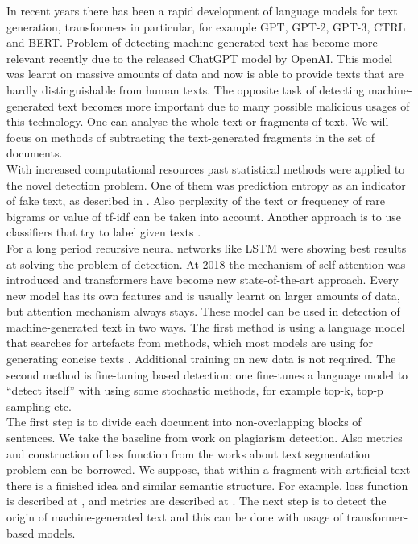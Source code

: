 \documentclass{article}
\begin{document}
In recent years there has been a rapid development of language models for text generation, transformers in particular, for example GPT\cite{gpt}, GPT-2\cite{gpt2}, GPT-3\cite{gpt3}, CTRL\cite{ctrl} and BERT\cite{bert}. Problem of detecting machine-generated text has become more relevant recently due to the released ChatGPT model by OpenAI. This model was learnt on massive amounts of data and now is able to provide texts that are hardly distinguishable from human texts. The opposite task of detecting machine-generated text becomes more important due to many possible malicious usages of this technology. One can analyse the whole text or fragments of text.
We will focus on methods of subtracting the text-generated fragments in the set of documents.\\
With increased computational resources past statistical methods were applied to the novel detection problem. One of them was prediction entropy as an indicator of fake text, as described in \cite{relativeentropy}. Also perplexity\cite{perplexity} of the text or frequency of rare bigrams \cite{rare_bigrams} or value of tf-idf \cite{solaiman} can be taken into account. Another approach is to use classifiers that try to label given texts \cite{Kuznetsov}.\\
For a long period recursive neural networks like LSTM were showing best results at solving the problem of detection. At 2018 the mechanism of self-attention\cite{Vaswani} was introduced and transformers have become new state-of-the-art approach.  Every new model has its own features and is usually learnt on larger amounts of data, but attention mechanism always stays. These model can be used in detection of machine-generated text in two ways\cite{solaiman}. The first method is using a language model that searches for artefacts from  methods, which most models are using for generating concise texts \cite{gltr}. Additional training on new data is not required. The second method is fine-tuning based detection: one fine-tunes a language model to “detect itself” with using some stochastic methods, for example top-k, top-p sampling etc.\\
The first step is to divide each document into non-overlapping blocks of sentences. We take the baseline from work\cite{Kuznetsov} on plagiarism detection. Also metrics and construction of loss function from the works about text segmentation problem can be borrowed. We suppose, that within a fragment with artificial text there is a finished idea and similar semantic structure. For example, loss function is described at \cite{ts_loss}, and metrics are described at \cite{ts_metrics}. The next step is to detect the origin of machine-generated text and this can be done with usage of transformer-based models. 
 
\end{document}
